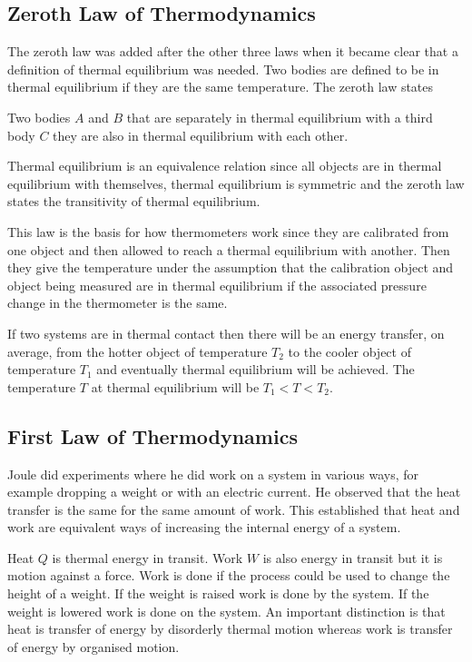 \documentclass{article}
\begin{document}
    \subsection{Zeroth Law of Thermodynamics}
    The zeroth law was added after the other three laws when it became clear that a definition of thermal equilibrium was needed.
    Two bodies are defined to be in thermal equilibrium if they are the same temperature.
    The zeroth law states
    \begin{displayquote}
        Two bodies \(A\) and \(B\) that are separately in thermal equilibrium with a third body \(C\) they are also in thermal equilibrium with each other.
    \end{displayquote}
    Thermal equilibrium is an equivalence relation since all objects are in thermal equilibrium with themselves, thermal equilibrium is symmetric and the zeroth law states the transitivity of thermal equilibrium.
    
    This law is the basis for how thermometers work since they are calibrated from one object and then allowed to reach a thermal equilibrium with another. 
    Then they give the temperature under the assumption that the calibration object and object being measured are in thermal equilibrium if the associated pressure change in the thermometer is the same.
    
    If two systems are in thermal contact then there will be an energy transfer, on average, from the hotter object of temperature \(T_2\) to the cooler object of temperature \(T_1\) and eventually thermal equilibrium will be achieved.
    The temperature \(T\) at thermal equilibrium will be \(T_1 < T < T_2\).
    
    \subsection{First Law of Thermodynamics}
    Joule did experiments where he did work on a system in various ways, for example dropping a weight or with an electric current.
    He observed that the heat transfer is the same for the same amount of work.
    This established that heat and work are equivalent ways of increasing the internal energy of a system.
    
    Heat \(Q\) is thermal energy in transit.
    Work \(W\) is also energy in transit but it is motion against a force.
    Work is done  if the process could be used to change the height of a weight.
    If the weight is raised work is done by the system.
    If the weight is lowered work is done on the system.
    An important distinction is that heat is transfer of energy by disorderly thermal motion whereas work is transfer of energy by organised motion.
    
\end{document}
